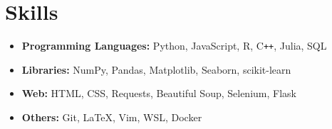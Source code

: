 \documentclass[letterpaper,11pt]{article}
\begin{document}
\section{Skills}
    \begin{itemize}
        \item \textbf{Programming Languages:} 
        Python, 
        JavaScript, 
        R, 
        C\texttt{++},
        Julia, 
        SQL
        
        \item \textbf{Libraries:} 
        NumPy, Pandas, Matplotlib, 
        Seaborn, 
        scikit-learn
        
        \item \textbf{Web:} 
        HTML, CSS, 
        Requests, 
        Beautiful Soup, 
        Selenium, 
        Flask


        \item \textbf{Others:} Git, \LaTeX, Vim, WSL, Docker
    \end{itemize}


\end{document}
